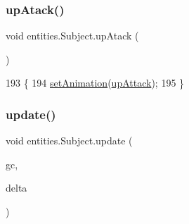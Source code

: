 \subsubsection{\texorpdfstring{up\+Atack()}{upAtack()}}
{\footnotesize\ttfamily void entities.\+Subject.\+up\+Atack (\begin{DoxyParamCaption}{ }\end{DoxyParamCaption})\hspace{0.3cm}{\ttfamily [inline]}}


\begin{DoxyCode}
193                           \{
194         \mbox{\hyperlink{classentities_1_1_animated_sprite_entity_a089bd746df0d8a9d5687240bb34af2dc}{setAnimation}}(\mbox{\hyperlink{classentities_1_1_subject_ab5b8390d2291803a2174b7ae146f86ac}{upAttack}});
195     \}
\end{DoxyCode}
\mbox{\label{classentities_1_1_subject_a13107be3805970106ba8ad637b942b4b}} 
\subsubsection{\texorpdfstring{update()}{update()}}
{\footnotesize\ttfamily void entities.\+Subject.\+update (\begin{DoxyParamCaption}\item[{\mbox{\hyperlink{classorg_1_1newdawn_1_1slick_1_1_game_container}{Game\+Container}}}]{gc,  }\item[{long}]{delta }\end{DoxyParamCaption})\hspace{0.3cm}{\ttfamily [inline]}}


